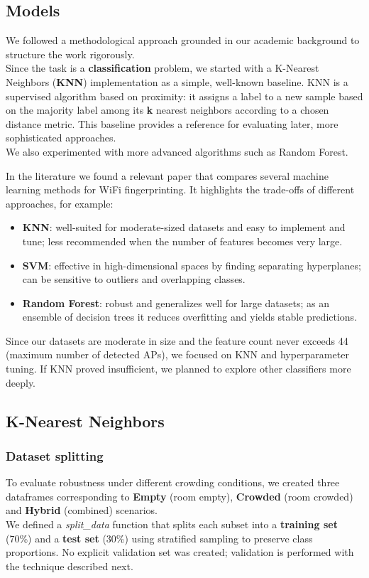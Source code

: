 \documentclass{article}
\begin{document}
\subsection{Models}
We followed a methodological approach grounded in our academic background to structure the work rigorously.\\

Since the task is a \textbf{classification} problem, we started with a K-Nearest Neighbors (\textbf{KNN}) implementation as a simple, well-known baseline. KNN is a supervised algorithm based on proximity: it assigns a label to a new sample based on the majority label among its \textbf{k} nearest neighbors according to a chosen distance metric. This baseline provides a reference for evaluating later, more sophisticated approaches.\\
We also experimented with more advanced algorithms such as Random Forest.

In the literature we found a relevant paper \cite{Shang2022} that compares several machine learning methods for WiFi fingerprinting. It highlights the trade-offs of different approaches, for example:
\begin{itemize}
    \item \textbf{KNN}: well-suited for moderate-sized datasets and easy to implement and tune; less recommended when the number of features becomes very large.
    \item \textbf{SVM}: effective in high-dimensional spaces by finding separating hyperplanes; can be sensitive to outliers and overlapping classes.
    \item \textbf{Random Forest}: robust and generalizes well for large datasets; as an ensemble of decision trees it reduces overfitting and yields stable predictions.
\end{itemize}

Since our datasets are moderate in size and the feature count never exceeds 44 (maximum number of detected APs), we focused on KNN and hyperparameter tuning. If KNN proved insufficient, we planned to explore other classifiers more deeply.

\subsection{K-Nearest Neighbors}
\subsubsection{Dataset splitting}
To evaluate robustness under different crowding conditions, we created three dataframes corresponding to \textbf{Empty} (room empty), \textbf{Crowded} (room crowded) and \textbf{Hybrid} (combined) scenarios.\\
We defined a \textit{split\_data} function that splits each subset into a \textbf{training set} (70\%) and a \textbf{test set} (30\%) using stratified sampling to preserve class proportions. No explicit validation set was created; validation is performed with the technique described next.
\end{document}
